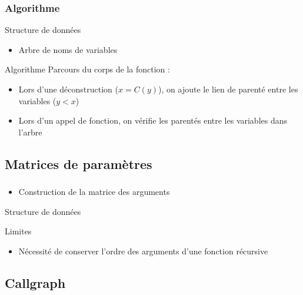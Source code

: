 \begin{frame}
  \frametitle{Algorithme}
  \begin{block}{Structure de données}
    \begin{itemize}
    \item Arbre de noms de variables
    \end{itemize}
  \end{block}
  \begin{block}{Algorithme}
    Parcours du corps de la fonction :
    \begin{itemize}
      \item Lors d'une déconstruction ($x = C(y)$), on ajoute le lien de parenté entre les variables ($y < x$)
      \item Lors d'un appel de fonction, on vérifie les parentés entre les variables dans l'arbre
    \end{itemize}
  \end{block}
\end{frame}

\subsection{Matrices de paramètres}

\begin{frame}
  \frametitle{}
  \begin{block}{}
    \begin{itemize}
      \item Construction de la matrice des arguments
    \end{itemize}
  \end{block}
  \begin{block}{Structure de données}
  \end{block}
  \begin{block}{Limites}
    \begin{itemize}
      \item Nécessité de conserver l'ordre des arguments d'une fonction récursive
    \end{itemize}
  \end{block}
\end{frame}

\subsection{Callgraph}

